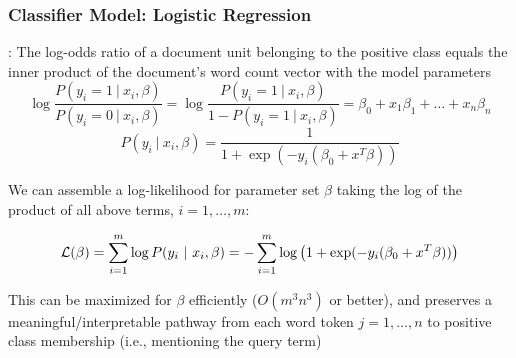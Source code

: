 \documentclass[10pt,slidestop,fxcolor=pst,dvips]{beamer}
\newcommand{\Blue}[1]{\color{blue}{#1}}
\begin{document}

\begin{frame}

\frametitle{Classifier Model: Logistic Regression}

\bit \item {\Blue{Logistic regression model}}: The log-odds ratio of a document unit belonging to the positive class equals the inner product of the document's word count vector with the model parameters \eit
\begin{equation}
\label{LRlogodds}
\log \frac{P(y_i = 1 ~|~ x_i, \beta)}{P(y_i = 0 ~|~ x_i, \beta)} = \log \frac{P(y_i = 1 ~|~ x_i, \beta)}{1 - P(y_i = 1 ~|~ x_i, \beta)} = \beta_0 + x_1\beta_1 + \ldots + x_n\beta_n
\end{equation}
\begin{equation}
P(y_i ~|~ x_i, \beta) = \frac{1}{1+\exp(-y_i(\beta_0 + x^T\beta))}
\end{equation}

\bit \item We can assemble a log-likelihood for parameter set $\beta$ taking the log of the product of all above terms, $i = 1, \dots, m$: \eit

\begin{equation}
\label{LRloglike}
{\cal{L}} (\beta) = \sum_{i=1}^m \log P(y_i ~|~ x_i, \beta) = -\sum_{i=1}^m \log \left(1+\exp(-y_i(\beta_0 + x^T\beta))\right)  
\end{equation}

\bit \item This can be maximized for $\beta$ efficiently ($O(m^3n^3)$ or better), and preserves a meaningful/interpretable pathway from each word token $j = 1, \ldots, n$ to positive class membership (i.e., mentioning the query term) \eit



\end{frame}
\end{document}
